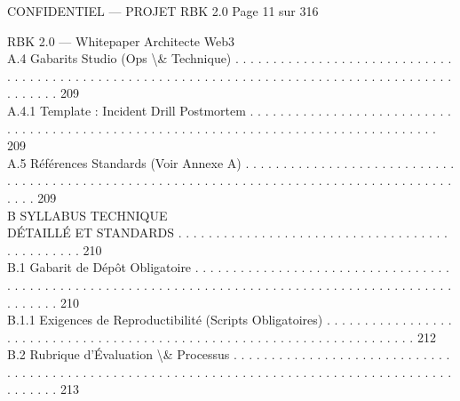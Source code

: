 \vspace{0.5em}
\vspace{0.5em}
\vspace{0.5em}
\vspace{0.5em}
\begin{confidential}CONFIDENTIEL — PROJET RBK 2.0                                                                               Page 11 sur 316\end{confidential}
RBK 2.0 — Whitepaper Architecte Web3\\
\vspace{0.5em}
\vspace{0.5em}
A.4     Gabarits Studio (Ops \textbackslash{}& Technique) . . . . . . . . . . . . . . . . . . . . . . . . . . . . . . . . . . . . . . . . . . . . . . . . . . . . . . . . . . . . . . . . . . . . . . . . . . . . . . . . . . . . . . . . . . . . . . . 209\\
A.4.1              Template : Incident Drill Postmortem . . . . . . . . . . . . . . . . . . . . . . . . . . . . . . . . . . . . . . . . . . . . . . . . . . . . . . . . . . . . . . . . . . . . . . . . . . . . . . . . . . . . 209\\
A.5     Références Standards (Voir Annexe A) . . . . . . . . . . . . . . . . . . . . . . . . . . . . . . . . . . . . . . . . . . . . . . . . . . . . . . . . . . . . . . . . . . . . . . . . . . . . . . . . . . . . . . . . . . . 209\\
\vspace{0.5em}
B     SYLLABUS TECHNIQUE\\
DÉTAILLÉ ET STANDARDS . . . . . . . . . . . . . . . . . . . . . . . . . . . . . . . . . . . . . . . . . . . . . . 210\\
B.1     Gabarit de Dépôt Obligatoire . . . . . . . . . . . . . . . . . . . . . . . . . . . . . . . . . . . . . . . . . . . . . . . . . . . . . . . . . . . . . . . . . . . . . . . . . . . . . . . . . . . . . . . . . . . . . . . . . . . . 210\\
B.1.1              Exigences de Reproductibilité (Scripts Obligatoires) . . . . . . . . . . . . . . . . . . . . . . . . . . . . . . . . . . . . . . . . . . . . . . . . . . . . . . . . . . . . . . . . . . . . . . . 212\\
B.2     Rubrique d’Évaluation \textbackslash{}& Processus . . . . . . . . . . . . . . . . . . . . . . . . . . . . . . . . . . . . . . . . . . . . . . . . . . . . . . . . . . . . . . . . . . . . . . . . . . . . . . . . . . . . . . . . . . . . . . . 213\\
